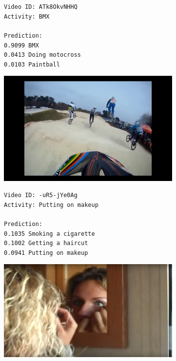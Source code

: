 \begin{figure}[H]
\begin{subfigure}[b]{.4\textwidth}
  \texttt{Video ID: ATk8OkvNHHQ \\
    Activity: BMX \\
    \\
    Prediction: \\
    0.9099	BMX \\
    0.0413	Doing motocross \\
    0.0103	Paintball \\}
\end{subfigure}%
\begin{subfigure}[b]{.6\textwidth}
  \centering
\includegraphics[width=0.95\linewidth]{img/results/activity_classification/results_visualization_classification_7}
\end{subfigure}

\begin{subfigure}[b]{.4\textwidth}
  \texttt{Video ID: -uR5-jYe0Ag \\
  Activity: Putting on makeup \\
  \\
  Prediction: \\
  0.1035	Smoking a cigarette \\
  0.1002	Getting a haircut \\
  0.0941	Putting on makeup \\}
\end{subfigure}%
\begin{subfigure}[b]{.6\textwidth}
  \centering
\includegraphics[width=0.95\linewidth]{img/results/activity_classification/results_visualization_classification_8}
\end{subfigure}


\end{figure}
